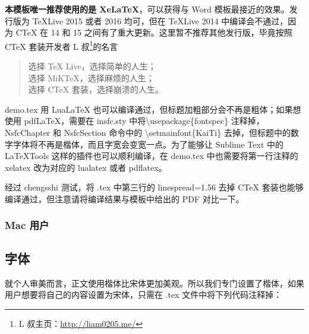 \textbf{本模板唯一推荐使用的是 XeLaTeX}，可以获得与 Word 模板最接近的效果。发行版为 TeXLive 2015 或者 2016 均可，但在 TeXLive 2014 中编译会不通过，因为 CTeX 在 14 和 15 之间有了重大更新。这里暂不推荐其他发行版，毕竟按照 CTeX 套装开发者 L 叔\footnote{L 叔主页：\href{http://liam0205.me/}{http://liam0205.me/}}的名言
\begin{quote}
	选择 TeX Live，选择简单的人生；\\
	选择 MiKTeX，选择麻烦的人生；\\
	选择 CTeX 套装，选择崩溃的人生。
\end{quote}

demo.tex 用 LuaLaTeX 也可以编译通过，但标题加粗部分会不再是粗体；如果想使用 pdfLaTeX，需要在 insfc.sty 中将\textbackslash usepackage\{fontspec\} 注释掉，NsfcChapter 和 NsfcSection 命令中的 \textbackslash setmainfont\{KaiTi\} 去掉，但标题中的数字字体将不再是楷体，而且字宽会变宽一点。为了能够让 Sublime Text 中的 LaTeXTools 这样的插件也可以顺利编译，在 demo.tex 中也需要将第一行注释的 xelatex 改为对应的 lualatex 或者 pdflatex。

经过 chengsshi 测试，将 .tex 中第三行的 linespread=1.56 去掉 CTeX 套装也能够编译通过，但注意请将编译结果与模板中给出的 PDF 对比一下。

\subsubsection{Mac 用户}


\subsection{字体}
就个人审美而言，正文使用楷体比宋体更加美观。所以我们专门设置了楷体，如果用户想要将自己的内容设置为宋体，只需在 .tex 文件中将下列代码注释掉：

